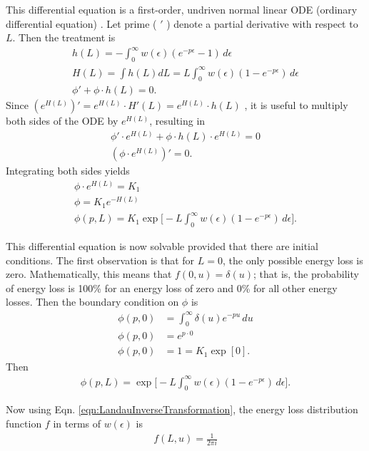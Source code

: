 This differential equation is a first-order, undriven normal linear ODE (ordinary differential equation) \cite{Borrelli}. Let prime ( $'$ ) denote a partial derivative with respect to $L$. Then the treatment is
%
\begin{gather*}
h(L)=-\int_0 ^\infty w(\epsilon)  (e^{-p\epsilon}-1)\, d\epsilon\\
H(L)=\int h(L) dL=L \int_0 ^\infty w(\epsilon)  (1-e^{-p\epsilon})\, d\epsilon\\
\phi ' + \phi \cdot h(L) = 0.
\end{gather*}
%
Since $(e^{H(L)}) ' = e^{H(L)}\cdot H'(L)= e^{H(L)}\cdot h(L)$ , it is useful to multiply both sides of the ODE by $e^{H(L)}$, resulting in
\begin{gather*}
\phi ' \cdot e^{H(L)}+ \phi \cdot h(L) \cdot e^{H(L)} = 0\\
(\phi\cdot e^{H(L)}) ' = 0.
\end{gather*}
Integrating both sides yields
\begin{gather*}
\phi\cdot e^{H(L)}=K_1\\
\phi = K_1 e^{-H(L)}\\
\phi(p,L)=K_1 \exp\Big[-L\int_0 ^\infty w(\epsilon)  (1-e^{-p\epsilon})\, d\epsilon\Big].
\end{gather*}

This differential equation is now solvable provided that there are initial conditions. The first observation is that for $L=0$, the only possible energy loss is zero. Mathematically, this means that $f(0,u)=\delta(u)$; that is, the probability of energy loss is 100\% for an energy loss of zero and 0\% for all other energy losses. Then the boundary condition on $\phi$ is
\begin{align}
\phi(p,0)&=\int_0 ^\infty \delta(u) e^{-pu}\, du\nonumber\\
\phi(p,0)&=e^{p\cdot 0}\nonumber\\
\phi(p,0)&=1=K_1\exp[0].\nonumber%
\end{align}
Then
\begin{gather*}
\phi(p,L)=\exp\Big[-L\int_0 ^\infty w(\epsilon)  (1-e^{-p\epsilon})\, d\epsilon\Big].
\end{gather*}

Now using Eqn. \ref{eqn:LandauInverseTransformation}, the energy loss distribution function $f$ in terms of $w(\epsilon)$ is 
\begin{gather*}
f(L,u)=\frac{1}{2\pi i} 
\end{gather*}

